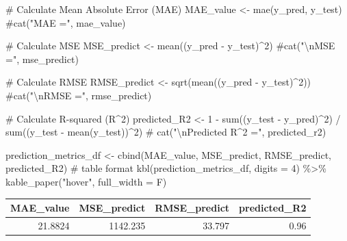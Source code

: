 \documentclass[
  letterpaper,
  DIV=11,
  numbers=noendperiod]{scrreprt}
\newenvironment{Shaded}{\begin{snugshade}}{\end{snugshade}}
\newcommand{\AttributeTok}[1]{\textcolor[rgb]{0.40,0.45,0.13}{#1}}
\newcommand{\CommentTok}[1]{\textcolor[rgb]{0.37,0.37,0.37}{#1}}
\newcommand{\DecValTok}[1]{\textcolor[rgb]{0.68,0.00,0.00}{#1}}
\newcommand{\FunctionTok}[1]{\textcolor[rgb]{0.28,0.35,0.67}{#1}}
\newcommand{\NormalTok}[1]{\textcolor[rgb]{0.00,0.23,0.31}{#1}}
\newcommand{\OtherTok}[1]{\textcolor[rgb]{0.00,0.23,0.31}{#1}}
\newcommand{\SpecialCharTok}[1]{\textcolor[rgb]{0.37,0.37,0.37}{#1}}
\newcommand{\StringTok}[1]{\textcolor[rgb]{0.13,0.47,0.30}{#1}}
\begin{document}
\begin{Shaded}
\begin{Highlighting}[]
\CommentTok{\# Calculate Mean Absolute Error (MAE)}
\NormalTok{MAE\_value }\OtherTok{\textless{}{-}} \FunctionTok{mae}\NormalTok{(y\_pred, y\_test)}
\CommentTok{\#cat("MAE =", mae\_value)}

\CommentTok{\# Calculate MSE}
\NormalTok{MSE\_predict }\OtherTok{\textless{}{-}} \FunctionTok{mean}\NormalTok{((y\_pred }\SpecialCharTok{{-}}\NormalTok{ y\_test)}\SpecialCharTok{\^{}}\DecValTok{2}\NormalTok{)}
\CommentTok{\#cat("\textbackslash{}nMSE =", mse\_predict)}

\CommentTok{\# Calculate RMSE}
\NormalTok{RMSE\_predict }\OtherTok{\textless{}{-}} \FunctionTok{sqrt}\NormalTok{(}\FunctionTok{mean}\NormalTok{((y\_pred }\SpecialCharTok{{-}}\NormalTok{ y\_test)}\SpecialCharTok{\^{}}\DecValTok{2}\NormalTok{))}
\CommentTok{\#cat("\textbackslash{}nRMSE =", rmse\_predict)}

\CommentTok{\# Calculate R{-}squared (R\^{}2)}
\NormalTok{predicted\_R2 }\OtherTok{\textless{}{-}} \DecValTok{1} \SpecialCharTok{{-}} \FunctionTok{sum}\NormalTok{((y\_test }\SpecialCharTok{{-}}\NormalTok{ y\_pred)}\SpecialCharTok{\^{}}\DecValTok{2}\NormalTok{) }\SpecialCharTok{/} 
  \FunctionTok{sum}\NormalTok{((y\_test }\SpecialCharTok{{-}} \FunctionTok{mean}\NormalTok{(y\_test))}\SpecialCharTok{\^{}}\DecValTok{2}\NormalTok{)}
\CommentTok{\# cat("\textbackslash{}nPredicted R\^{}2 =", predicted\_r2)}

\NormalTok{prediction\_metrics\_df }\OtherTok{\textless{}{-}} \FunctionTok{cbind}\NormalTok{(MAE\_value, MSE\_predict,}
\NormalTok{                               RMSE\_predict, predicted\_R2)}
\CommentTok{\# table format}
\FunctionTok{kbl}\NormalTok{(prediction\_metrics\_df, }\AttributeTok{digits =} \DecValTok{4}\NormalTok{) }\SpecialCharTok{\%\textgreater{}\%}
  \FunctionTok{kable\_paper}\NormalTok{(}\StringTok{"hover"}\NormalTok{, }\AttributeTok{full\_width =}\NormalTok{ F)}
\end{Highlighting}
\end{Shaded}

\begin{table}
\centering
\begin{tabular}[t]{r|r|r|r}
\hline
MAE\_value & MSE\_predict & RMSE\_predict & predicted\_R2\\
\hline
21.8824 & 1142.235 & 33.797 & 0.96\\
\hline
\end{tabular}
\end{table}
\end{document}
